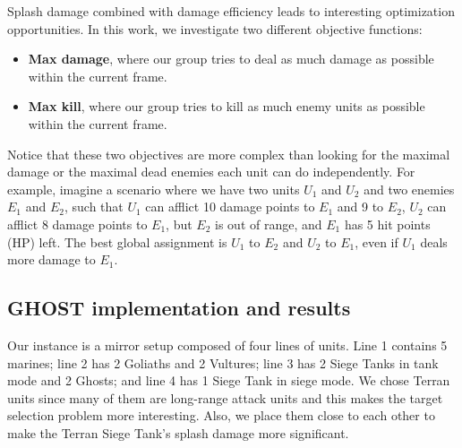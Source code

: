 \documentclass[journal]{IEEEtran}
\newcommand{\ghost}{\textsc{GHOST}\xspace}
\begin{document}
Splash  damage combined  with damage  efficiency leads  to interesting
optimization  opportunities.   In  this   work,  we  investigate  two
different objective functions:
\begin{itemize}
\item {\bf Max  damage}, where our group tries to  deal as much damage
  as possible within the current frame.
\item {\bf  Max kill},  where our  group tries to  kill as  much enemy
  units as possible within the current frame.
\end{itemize}
Notice that these two objectives are  more complex than looking for the
maximal  damage  or  the  maximal   dead  enemies  each  unit  can  do
independently. For example, imagine  a scenario where we  have two units $U_1$  and $U_2$
and two enemies $E_1$  and $E_2$, such that $U_1$ can  afflict 10 damage points
to $E_1$ and 9 to $E_2$, $U_2$ can afflict 8 damage points to $E_1$, but $E_2$ is out
of  range,  and $E_1$  has  5  hit points  (HP)  left.   The best  global
assignment is $U_1$ to  $E_2$ and $U_2$ to $E_1$, even if $U_1$  deals more damage to
$E_1$.

\subsection{\ghost implementation and results}

Our instance is a mirror setup composed of four lines of units. Line 1
contains 5 marines; line 2 has 2 Goliaths and 2 Vultures; line 3 has 2 Siege
Tanks in tank mode  and 2 Ghosts; and line 4 has 1 Siege  Tank in siege mode.
We chose  Terran units  since many of  them are
long-range attack  units and this  makes the target  selection problem
more  interesting.  Also,  we place  them close to each
other to make the Terran Siege Tank's splash damage more significant.
\end{document}
